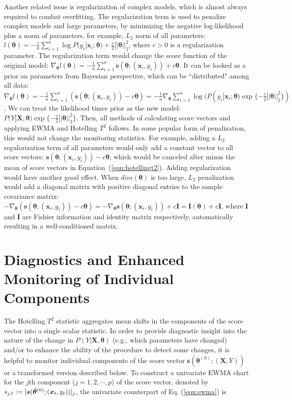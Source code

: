 \documentclass[twoside,11pt]{article}
\begin{document}
Another related issue is regularization of complex models, which is almost always required to combat overfitting. The regularization term is used to penalize complex models and large parameters, by minimizing the negative log-likelihood plus a norm of parameters, for example, $L_2$ norm of all parameters: $l(\bm{\theta})=-\frac{1}{n}\sum_{i=1}^n \log P(y_i|\bm{x}_i;\bm{\theta})+\frac{c}{2}||\bm{\theta}||_2^2$, where $c>0$ is a regularization parameter. The regularization term would change the score function of the original model: $\nabla_{\bm{\theta}}l(\bm{\theta}) = -\frac{1}{n}\sum_{i=1}^n\bm{s}(\bm{\theta};(\bm{x}_i,y_i))+c\bm{\theta}$. It can be looked as a prior on parameters from Bayesian perspective, which can be ``distributed" among all data: $\nabla_{\bm{\theta}}l(\bm{\theta})=-\frac{1}{n}\sum_{i=1}^n(\bm{s}(\bm{\theta};(\bm{x}_i,y_i))-c\bm{\theta})=-\frac{1}{n}\nabla_{\bm{\theta}}\sum_{i=1}^n\log(P(y_i|\bm{x}_i;\bm{\theta})\exp\{-\frac{c}{2}||\bm{\theta}||_{2}^2\})$. We can treat the likelihood times prior as the new model: $P(Y|\bm{X};\bm{\theta})\exp\{-\frac{c}{2}||\bm{\theta}||_{2}^2\}$. Then, all methods of calculating score vectors and applying EWMA and Hotelling $T^2$ follows. In some popular form of penalization, this would not change the monitoring statistics. For example, adding a $L_2$ regularization term of all parameters would only add a constant vector to all score vectors: $\bm{s}(\bm{\theta};(\bm{x}_i,y_i))-c\bm{\theta}$, which would be canceled after minus the mean of score vectors in Equation~(\ref{eqn:hotellingt2}). Adding regularization would have another good effect. When $dim ( \bm { \theta})$ is too large, $L_2$ penalization would add a diagonal matrix with positive diagonal entries to the sample covariance matrix: $-\nabla_{\bm{\theta}}(\bm{s}(\bm{\theta};(\bm{x}_i,y_i))-c\bm{\theta})=-\nabla_{\bm{\theta}}\bm{s}(\bm{\theta};(\bm{x}_i,y_i))+c\bm{I}=\mathbf{I}(\bm{\theta})+c\bm{I}$, where $\mathbf{I}$ and $\bm{I}$ are Fishier information and identity matrix respectively, automatically resulting in a well-conditioned matrix. 

\section{Diagnostics and Enhanced Monitoring of Individual Components}
\label{s:decou_cd}
The Hotelling $T^2$ statistic aggregates mean shifts in the components of the score vector into a single scalar statistic. In order to provide diagnostic insight into the nature of the change in $P(Y| \bm {X}, \bm{\theta})$ (e.g., which parameters have changed) and/or to enhance the ability of the procedure to detect some changes, it is helpful to monitor individual components of the score vector $\bm{s}(\bm { \theta}^{ (0)}; (\bm {X}, Y))$ or a transformed version described below. To construct a univariate EWMA chart for the $j$th component ($j=1,2,\cdots,p$) of the score vector, denoted by $s_{j,t} \vcentcolon= [\bm{s}(\hat{\bm { \theta}}^{(0)};(\bm {x}_t, y_t))]_j$, the univariate counterpart of Eq. (\ref{eqn:ewma}) is
\end{document}
